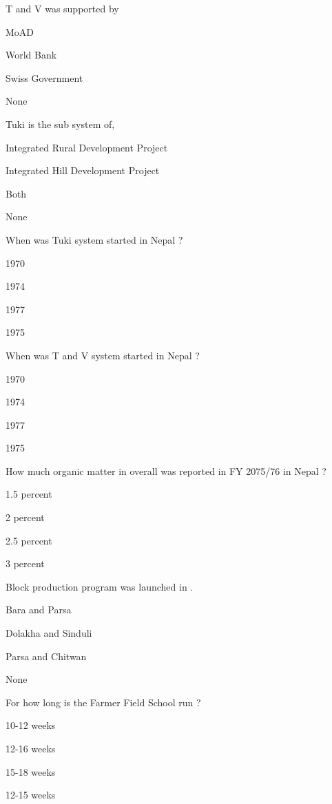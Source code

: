 \begin{questions}
\question T and V was supported by
\begin{items}
\item MoAD
\item* World Bank
\item Swiss Government
\item None
\end{items}

\question Tuki is the sub system of,
\begin{items}
\item Integrated Rural Development Project
\item* Integrated Hill Development Project
\item Both
\item None
\end{items}

\question When was Tuki system started in Nepal ?
\begin{items}
\item 1970
\item 1974
\item* 1977
\item 1975
\end{items}

\question When was T and V system started in Nepal ?
\begin{items}
\item 1970
\item 1974
\item 1977
\item* 1975
\end{items}

\question How much organic matter in overall was reported in FY 2075/76 in Nepal ?
\begin{items}
\item 1.5 percent
\item 2 percent
\item 2.5 percent
\item* 3 percent
\end{items}

\question Block production program was launched in \fillin[][3cm].
\begin{items}
\item Bara and Parsa
\item Dolakha and Sinduli
\item* Parsa and Chitwan
\item None
\end{items}

\question For how long is the Farmer Field School run ?
\begin{items}
\item 10-12 weeks
\item 12-16 weeks
\item 15-18 weeks
\item* 12-15 weeks
\end{items}


\end{questions}

